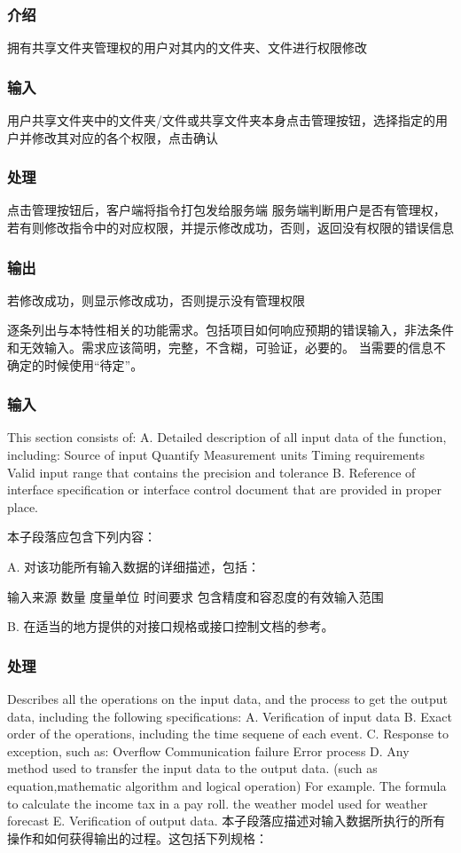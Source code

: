 \subsubsection{介绍}
拥有共享文件夹管理权的用户对其内的文件夹、文件进行权限修改

\subsubsection{输入} 
用户共享文件夹中的文件夹/文件或共享文件夹本身点击管理按钮，选择指定的用户并修改其对应的各个权限，点击确认

\subsubsection{处理} 
点击管理按钮后，客户端将指令打包发给服务端
服务端判断用户是否有管理权，若有则修改指令中的对应权限，并提示修改成功，否则，返回没有权限的错误信息

\subsubsection{输出} 
若修改成功，则显示修改成功，否则提示没有管理权限



逐条列出与本特性相关的功能需求。包括项目如何响应预期的错误输入，非法条件和无效输入。需求应该简明，完整，不含糊，可验证，必要的。 当需要的信息不确定的时候使用“待定”。
\subsubsection{输入}
This section consists of:
A. Detailed description of all input data of the function, including:
Source of input
Quantify
Measurement units
Timing requirements
Valid input range that contains the precision and tolerance
B. Reference of interface specification or interface control document that are provided in proper place.

本子段落应包含下列内容：

A. 对该功能所有输入数据的详细描述，包括：

		输入来源
		数量
		度量单位
		时间要求
		包含精度和容忍度的有效输入范围
		
B. 在适当的地方提供的对接口规格或接口控制文档的参考。
\subsubsection{处理}
Describes all the operations on the input data, and the process to get the output data, including the following specifications:
A. Verification of input data
B. Exact order of the operations, including the time sequene of each event.
C. Response to exception, such as:
		 Overflow
		Communication failure
		Error process
D. Any method used to transfer the input data to the output data. (such as equation,mathematic algorithm and logical operation)
For example.
		The formula to calculate the income tax in a pay roll.
		the weather model used for weather forecast
E. Verification of output data.
本子段落应描述对输入数据所执行的所有操作和如何获得输出的过程。这包括下列规格：

